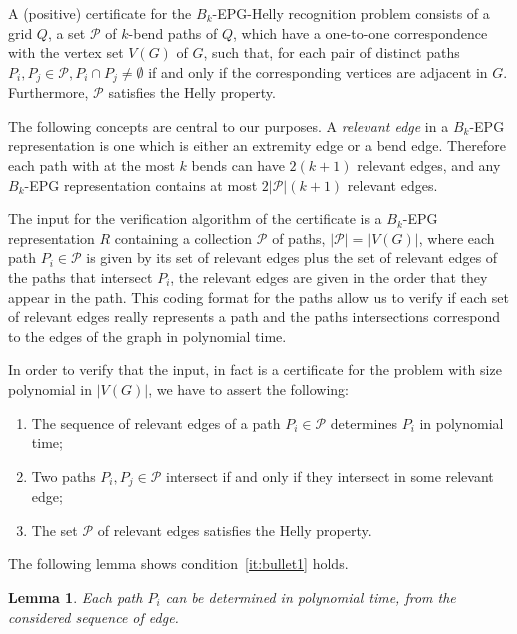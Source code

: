 \documentclass[9pt]{entcs}
\newtheorem{lema}{Lemma}[section]
\begin{document}


A (positive) certificate for the {\sc $B_k$-EPG-Helly recognition} problem consists of a grid $Q$, a set $\mathcal{P}$ of $k$-bend paths of $Q$, which have a one-to-one correspondence with the vertex set $V(G)$ of $G$, such that, for each pair of distinct paths $P_i, P_j\in \mathcal{P}, P_i\cap P_j \neq \emptyset $ if and only if the corresponding vertices are adjacent in $G$. Furthermore, $\mathcal{P}$ satisfies the Helly property.


The following concepts are central to our purposes. A \emph{relevant edge} in a  $B_k$-EPG representation is one which is either an extremity edge or a bend edge. Therefore each path with at the most $k$ bends can have $2(k+1)$ relevant edges, and any $B_k$-EPG representation contains at most $2|\mathcal{P}|(k+1)$ relevant edges.

The input for the verification algorithm of the certificate is a $B_k$-EPG representation $R$ containing a collection $\mathcal{P}$ of paths, $|\mathcal{P}|=|V(G)|$, where each path $P_i \in \mathcal{P}$ is given by its set of relevant edges plus the set of relevant edges of the paths that intersect $P_i$, the relevant edges are given in the order that they appear in the path. This coding format for the paths allow us to verify if each set of relevant edges really represents a path and the paths intersections correspond to the edges of the graph in polynomial time.

In order to verify that the input, in fact is a certificate for the problem with size polynomial in $|V(G)|$, we have to assert the following:

\begin{enumerate}[label=(\roman*)]
\item The sequence of relevant edges of a path $P_i\in \mathcal{P}$ determines $P_i$ in polynomial time; \label{it:bullet1}

\item Two paths $P_i, P_j \in \mathcal{P}$ intersect if and only if they intersect in some relevant edge; \label{it:bullet2}

\item The set $\mathcal{P}$ of relevant edges satisfies the Helly property.  \label{it:bullet3}
\end{enumerate}

The following lemma shows condition~\ref{it:bullet1} holds.

\begin{lema}\label{lem:verify1}
Each path $P_i$ can be determined in polynomial time, from the considered sequence of edge.
\end{lema}
\end{document}
